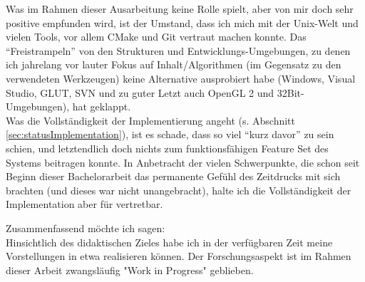 Was im Rahmen dieser Ausarbeitung keine Rolle spielt, aber von mir doch sehr positive empfunden wird,
ist der Umstand, dass ich mich mit der Unix-Welt und vielen Tools, vor allem CMake und Git vertraut
machen konnte. Das "`Freistrampeln"' von den Strukturen und Entwicklungs-Umgebungen,
zu denen ich jahrelang vor lauter Fokus auf Inhalt/Algorithmen (im Gegensatz zu den verwendeten Werkzeugen)
keine Alternative ausprobiert habe (Windows, Visual Studio, GLUT, SVN und zu guter Letzt auch OpenGL 2 und 32Bit-Umgebungen), hat geklappt.\\

Was die Vollständigkeit der Implementierung angeht (s. Abschnitt \ref{sec:statusImplementation}), ist es schade,
dass so viel "`kurz davor"' zu sein schien, und letztendlich doch nichts zum funktionsfähigen Feature Set
des Systems beitragen konnte. In Anbetracht der vielen Schwerpunkte, die schon seit Beginn dieser Bachelorarbeit
das permanente Gefühl des Zeitdrucks mit sich brachten (und dieses war nicht unangebracht), halte ich die
Vollständigkeit der Implementation aber für vertretbar.


Zusammenfassend möchte ich sagen:\\
Hinsichtlich des didaktischen Zieles habe ich in der verfügbaren Zeit meine Vorstellungen in etwa realisieren können. Der Forschungsaspekt ist im Rahmen dieser Arbeit zwangsläufig "Work in Progress" geblieben.


\clearpage